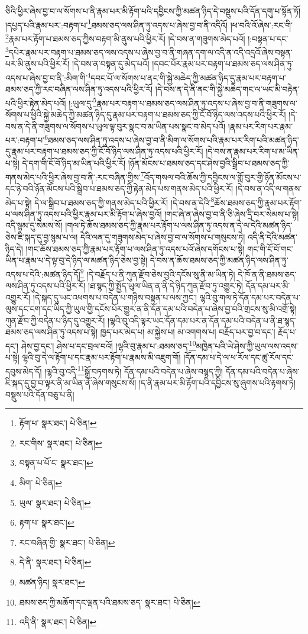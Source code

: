 ཅིའི་ཕྱིར་ཞེས་བྱ་བ་ལ་སོགས་པ་ནི་རྣམ་པར་མི་རྟོག་པའི་དབྱིངས་ཀྱི་མཚན་ཉིད་དེ་བསྡུས་པའི་དོན་དགུ་པ་སྟོན་ཏོ། །དཔྱད་པའི་རྣམ་པར་:བརྟག་པ་\footnote{རྟོག་པ་  སྣར་ཐང་།  པེ་ཅིན། }ཐམས་ཅད་ལས་ཤིན་ཏུ་འདས་པ་ཞེས་བྱ་བ་ནི་འདིའོ། །ཕ་བའི་འོ་ཞེས་:རང་གི་\footnote{རང་གིས་  སྣར་ཐང་།  པེ་ཅིན། }རྣམ་པར་རྟོག་པ་ཐམས་ཅད་ཀྱིས་བརྟག་མི་ནུས་པའི་ཕྱིར་རོ། །དེ་བས་ན་གཟུགས་མེད་པའོ། །:བསྟན་པ་དང་\footnote{བསྟན་པ་པོ་ང་  སྣར་ཐང་། }དཔེར་རྣམ་པར་བརྟག་པ་ཐམས་ཅད་ལས་འདས་པ་ཞེས་བྱ་བ་ནི་གཞན་དག་ལ་འདི་ན་འདི་འདྲའོ་ཞེས་བསྟན་པར་མི་ནུས་པའི་ཕྱིར་རོ། །དེ་བས་ན་བསྟན་དུ་མེད་པའོ། །དབང་པོར་རྣམ་པར་བརྟག་པ་ཐམས་ཅད་ལས་ཤིན་ཏུ་འདས་པ་ཞེས་བྱ་བ་ནི་:མིག་གི་\footnote{མིག་  པེ་ཅིན། }དབང་པོ་ལ་སོགས་པ་ནང་གི་སྐྱེ་མཆེད་ཀྱི་མཚན་ཉིད་དུ་རྣམ་པར་བརྟག་པ་ཐམས་ཅད་ཀྱི་རང་བཞིན་ལས་ཤིན་ཏུ་འདས་པའི་ཕྱིར་རོ། །དེ་བས་ན་དེ་ནི་ནང་གི་སྐྱེ་མཆེད་གང་ལ་ཡང་མི་བརྟེན་པའི་ཕྱིར་རྟེན་མེད་པའོ། །:ཡུལ་དུ་\footnote{ཡུལ་  སྣར་ཐང་།  པེ་ཅིན། }རྣམ་པར་བརྟག་པ་ཐམས་ཅད་ལས་ཤིན་ཏུ་འདས་པ་ཞེས་བྱ་བ་ནི་གཟུགས་ལ་སོགས་པ་ཕྱིའི་སྐྱེ་མཆེད་ཀྱི་མཚན་ཉིད་དུ་རྣམ་པར་བརྟག་པ་ཐམས་ཅད་ཀྱི་ངོ་བོ་ཉིད་ལས་འདས་པའི་ཕྱིར་རོ། །དེ་བས་ན་དེ་ནི་གཟུགས་ལ་སོགས་པ་ཡུལ་ལྟ་བུར་སྣང་བ་མ་ཡིན་པས་སྣང་བ་མེད་པའོ། །རྣམ་པར་རིག་པར་རྣམ་པར་:བརྟག་པ་\footnote{རྟག་པ་  སྣར་ཐང་། }ཐམས་ཅད་ལས་ཤིན་ཏུ་འདས་པ་ཞེས་བྱ་བ་ནི་མིག་ལ་སོགས་པའི་རྣམ་པར་རིག་པའི་མཚན་ཉིད་དུ་རྣམ་པར་བརྟག་པ་ཐམས་ཅད་ཀྱི་ངོ་བོ་ཉིད་ལས་ཤིན་ཏུ་འདས་པའི་ཕྱིར་རོ། །དེ་བས་ན་རྣམ་པར་རིག་པ་མ་ཡིན་པ་སྟེ། དེ་དག་གི་ངོ་བོ་ཉིད་མ་ཡིན་པའི་ཕྱིར་རོ། །ཉོན་མོངས་པ་ཐམས་ཅད་དང་ཤེས་བྱའི་སྒྲིབ་པ་ཐམས་ཅད་ཀྱི་གནས་མེད་པའི་ཕྱིར་ཞེས་བྱ་བ་ནི་:རང་བཞིན་གྱིས་\footnote{རང་བཞིན་གྱི་  སྣར་ཐང་།  པེ་ཅིན། }འོད་གསལ་བའི་ཆོས་ཀྱི་དབྱིངས་ལ་གློ་བུར་གྱི་ཉོན་མོངས་པ་དང་ཉེ་བའི་ཉོན་མོངས་པའི་སྒྲིབ་པ་ཐམས་ཅད་ཀྱི་རྟེན་མེད་པས་གནས་མེད་པའི་ཕྱིར་རོ། །དེ་བས་ན་འདི་ལ་གནས་མེད་པ་སྟེ། དེ་ལ་སྒྲིབ་པ་ཐམས་ཅད་ཀྱི་གནས་མེད་པའི་ཕྱིར་རོ། །དེ་བས་ན་དེའི་\footnote{དེ་ནི་  སྣར་ཐང་།  པེ་ཅིན། }ཆོས་ཐམས་ཅད་ཀྱི་རྣམ་པར་རྟོག་པ་ལས་ཤིན་ཏུ་འདས་པའི་ཕྱིར་རྣམ་པར་མི་རྟོག་པ་ཞེས་བྱའོ། །གང་ཞེ་ན་ཞེས་བྱ་བ་ནི་ཅི་ཞེས་དྲི་བར་སེམས་པ་སྟེ། འདི་སྙམ་དུ་སེམས་སོ། །གལ་ཏེ་ཆོས་ཐམས་ཅད་ཀྱི་རྣམ་པར་རྟོག་པ་ལས་ཤིན་ཏུ་འདས་ན་དེ་ལ་དེའི་མཚན་ཉིད་ཅེས་ཇི་སྐད་དུ་བྱ་སྙམ་པ་ལ། དེའི་ལན་དུ་གཟུགས་མེད་པ་ཞེས་བྱ་བ་ལ་སོགས་པ་གསུངས་ཏེ། འདི་ནི་དེའི་མཚན་ཉིད་དེ། །གང་ཆོས་ཐམས་ཅད་ཀྱི་རྣམ་པར་རྟོག་པ་ལས་ཤིན་ཏུ་འདས་པའོ་ཞེས་དགོངས་པ་སྟེ། གང་གི་ངོ་བོ་གང་ཡིན་པ་རྣམ་པ་དེ་ལྟ་བུ་དེ་ཉིད་ལ་མཚན་ཉིད་ཅེས་བྱ་སྟེ། དེ་བས་ན་ཆོས་ཐམས་ཅད་ཀྱི་མཚན་ཉིད་ལས་ཤིན་ཏུ་འདས་པ་དེའི་:མཚན་ཉིད་དོ།\footnote{མཚན་ཉིད།  སྣར་ཐང་། } །དེ་བརྗོད་པ་ནི་ཀུན་རྫོབ་ཅེས་བྱའི་དངོས་སུ་ནི་མ་ཡིན་ཏེ། དེ་ཁོ་ན་ནི་ཐམས་ཅད་ལས་ཤིན་ཏུ་འདས་པའི་ཕྱིར་རོ། །ཐ་སྙད་ཀྱི་སྤྱོད་ཡུལ་ཡིན་ན་ནི་དེ་ཉིད་ཀུན་རྫོབ་ཏུ་འགྱུར་ཏེ། དོན་དམ་པར་མི་འགྱུར་རོ། །དེ་སྐད་དུ་ཡང་འཕགས་པ་བདེན་པ་གཉིས་བསྟན་པ་ལས་ཀྱང་། ལྷའི་བུ་གལ་ཏེ་དོན་དམ་པར་བདེན་པ་ལུས་དང་ངག་དང་ཡིད་ཀྱི་ཡུལ་གྱི་དངོས་པོར་གྱུར་ན་ནི་དོན་དམ་པའི་བདེན་པ་ཞེས་བྱ་བའི་གྲངས་སུ་མི་འགྲོ་སྟེ། ཀུན་རྫོབ་ཀྱི་བདེན་པ་ཉིད་དུ་འགྱུར་རོ། །ལྷའི་བུ་འདི་ལྟར་ཡང་དོན་དམ་པར་ན་དོན་དམ་པའི་བདེན་པ་ནི་ཐ་སྙད་ཐམས་ཅད་ལས་ཤིན་ཏུ་འདས་པ་སྟེ། ཁྱད་པར་མེད་པ། མ་སྐྱེས་པ། མ་འགགས་པ། བརྗོད་པར་བྱ་བ་དང་། རྗོད་པ་དང་། ཤེས་བྱ་དང་། ཤེས་པ་དང་བྲལ་བའོ། །ལྷའི་བུ་རྣམ་པ་:ཐམས་ཅད་\footnote{ཐམས་ཅད་ཀྱི་མཆོག་དང་ལྡན་པའི་ཐམས་ཅད་  སྣར་ཐང་།  པེ་ཅིན། }མཁྱེན་པའི་ཡེ་ཤེས་ཀྱི་ཡུལ་ལས་འདས་པ་སྟེ། ལྷའི་བུ་དེ་ལ་རྟོག་པ་དང་རྣམ་པར་རྟོག་པ་རྣམས་མི་འཇུག་གོ། །དོན་དམ་པ་དེ་ལ་ཕ་རོལ་དང་ཚུ་རོལ་དང་དབུས་མེད་དོ། །ལྷའི་བུ་འདི་\footnote{འདི་ནི་  སྣར་ཐང་།  པེ་ཅིན། }སྒྲོ་བཏགས་ཏེ། དོན་དམ་པའི་བདེན་པ་ཞེས་བསྙད་ཀྱི། དོན་དམ་པའི་བདེན་པ་ཞེས་ཇི་སྐད་དུ་བྱ་བ་ལྟར་ནི་མ་ཡིན་ནོ་ཞེས་གསུངས་སོ། །ད་ནི་རྣམ་པར་མི་རྟོག་པའི་དབྱིངས་སུ་ཞུགས་པའི་རྟགས་ཏེ། བསྡུས་པའི་དོན་བཅུ་པ་ནི། 